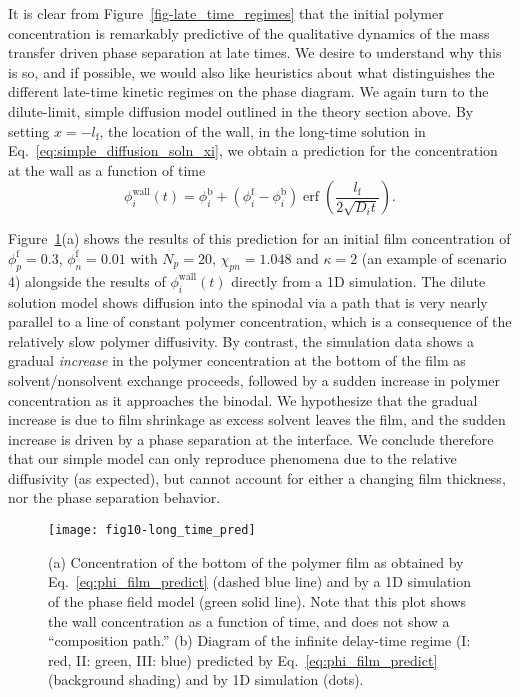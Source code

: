\documentclass[journal=mamobx, layout=twocolumn]{achemso}
\DeclareMathOperator{\erf}{erf}
\newcommand{\txtf}{\mathrm{f}}
\newcommand{\txtb}{\mathrm{b}}
\begin{document}
It is clear from Figure~\ref{fig-late_time_regimes} that the initial polymer concentration is remarkably predictive of the qualitative dynamics of the mass transfer driven phase separation at late times.
We desire to understand why this is so, and if possible, we would also like heuristics about what distinguishes the different late-time kinetic regimes on the phase diagram.
We again turn to the dilute-limit, simple diffusion model outlined in the theory section above.
By setting $x = -l_{\txtf}$, the location of the wall, in the long-time solution in Eq.~\ref{eq:simple_diffusion_soln_xi}, we obtain a prediction for the concentration at the wall as a function of time
\begin{equation} \label{eq:phi_film_predict}
\phi_{i}^{\mathrm{wall}}(t) = \phi_{i}^{\txtb} + (\phi_{i}^{\txtf} - \phi_{i}^{\txtb}) \erf \left ( \frac{l_{\txtf}}{2 \sqrt{D_{i} t}} \right ) \textrm{.}
\end{equation}

Figure~\ref{fig-long_time_pred}(a) shows the results of this prediction for an initial film concentration of $\phi_{p}^{\txtf} = 0.3$, $\phi_{n}^{\txtf} = 0.01$ with $N_{p} = 20$, $\chi_{pn} = 1.048$ and $\kappa = 2$ (an example of scenario 4) alongside the results of $\phi_{i}^{\mathrm{wall}}(t)$ directly from a 1D simulation.
The dilute solution model shows diffusion into the spinodal via a path that is very nearly parallel to a line of constant polymer concentration, which is a consequence of the relatively slow polymer diffusivity.
By contrast, the simulation data shows a gradual \emph{increase} in the polymer concentration at the bottom of the film as solvent/nonsolvent exchange proceeds, followed by a sudden increase in polymer concentration as it approaches the binodal.
We hypothesize that the gradual increase is due to film shrinkage as excess solvent leaves the film, and the sudden increase is driven by a phase separation at the interface.
We conclude therefore that our simple model can only reproduce phenomena due to the relative diffusivity (as expected), but cannot account for either a changing film thickness, nor the phase separation behavior.

\begin{figure}[tbp]
  \texttt{[image: fig10-long\_time\_pred]}
  \caption{
(a) Concentration of the bottom of the polymer film as obtained by Eq.~\ref{eq:phi_film_predict} (dashed blue line) and by a 1D simulation of the phase field model (green solid line).
Note that this plot shows the wall concentration as a function of time, and does not show a ``composition path.''
(b) Diagram of the infinite delay-time regime (I: red, II: green, III: blue) predicted by Eq.~\ref{eq:phi_film_predict} (background shading) and by 1D simulation (dots).
}
  \label{fig-long_time_pred}
\end{figure}
\end{document}

